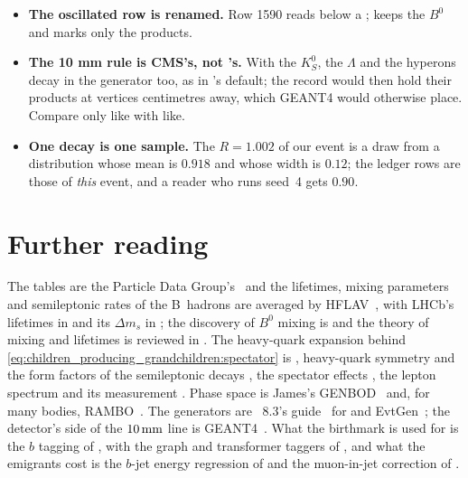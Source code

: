 \begin{itemize}
    two-body decay of a pseudoscalar gets $\cos^2\theta$; \PYTHIA wants a
    pseudoscalar sister, has $\sin^2\theta$ beside a photon and nothing
    beside a vector, the case of our two $K^*$.
  \item \textbf{The oscillated row is renamed.} Row 1590 reads \Bbar
    below a \Bstar; \PYTHIA keeps the $B^0$ and marks only the products.
  \item \textbf{The 10 mm rule is CMS's, not \PYTHIA's.} With
     the $K_S^0$, the $\Lambda$ and the hyperons
    decay in the generator too, as in \PYTHIA's default; the record would
    then hold their products at vertices centimetres away, which GEANT4
    would otherwise place. Compare only like with like.
  \item \textbf{One decay is one sample.} The $R=1.002$ of our event is a
    draw from a distribution whose mean is $0.918$ and whose width is
    $0.12$; the ledger rows are those of \emph{this} event, and a reader
    who runs seed~4 gets $0.90$.
\end{itemize}

\section{Further reading}
\label{sec:children_producing_grandchildren:further_reading}
The tables are the Particle Data Group's~\cite{ParticleDataGroup:2024cfk}
and the lifetimes, mixing parameters and semileptonic rates of the
B~hadrons are averaged by HFLAV~\cite{HeavyFlavorAveragingGroupHFLAV:2024ctg},
with LHCb's lifetimes in \cite{LHCb:2014qsd} and its $\Delta m_s$ in
\cite{LHCb:2021moh}; the discovery of $B^0$ mixing is
\cite{ARGUS:1987xtv} and the theory of mixing and lifetimes is reviewed in
\cite{Artuso:2015swg,Lenz:2014jha,Lenz:2022rbq}. The heavy-quark
expansion behind \cref{eq:children_producing_grandchildren:spectator} is
\cite{Bigi:1992su,Manohar:1993qn}, heavy-quark symmetry and the form
factors of the semileptonic decays
\cite{Isgur:1989vq,Neubert:1993mb,Caprini:1997mu,Boyd:1995sq}, the
spectator effects \cite{Neubert:1996we}, the lepton spectrum
\cite{Altarelli:1982kh} and its measurement \cite{BaBar:2004bij}. Phase
space is James's GENBOD~\cite{James:1968gu} and, for many bodies,
RAMBO~\cite{Kleiss:1985gy}. The generators are \PYTHIA~8.3's
guide~\cite{Bierlich:2022pfr} for  and
EvtGen~\cite{Lange:2001uf,Abudinen:2024wpc}; the detector's side of the
$10\,\mathrm{mm}$ line is GEANT4~\cite{GEANT4:2002zbu}. What the birthmark is used
for is the $b$ tagging of \cite{CMS:2012feb,CMS:2017wtu,Bols:2020bkb},
with the graph and transformer taggers of
\cite{Qu:2019gqs,Qu:2022mxj,ATLAS:2022rkn,ATLAS:2025dkv}, and what the
emigrants cost is the $b$-jet energy regression of \cite{CMS:2019uxx} and
the muon-in-jet correction of \cite{CMS:2018nsn}.

